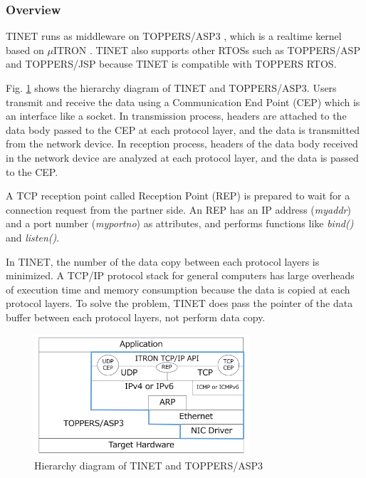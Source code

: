 \documentclass[conference]{IEEEtran/IEEEtran}
\begin{document}
\subsubsection{Overview}

TINET runs as middleware on TOPPERS/ASP3 \cite{par:ASP3} \cite{url:ASP3}, which is a realtime kernel based on $\mu$ITRON \cite{par:microITRON}.
TINET also supports other RTOSs such as TOPPERS/ASP and TOPPERS/JSP because TINET is compatible with TOPPERS RTOS.

Fig. \ref{fig:TINETHierarchyDiagram} shows the hierarchy diagram of TINET and TOPPERS/ASP3.
Users transmit and receive the data using a Communication End Point (CEP) which is an interface like a socket.
In transmission process, headers are attached to the data body passed to the CEP at each protocol layer, and the data is transmitted from the network device.
In reception process, headers of the data body received in the network device are analyzed at each protocol layer, and the data is passed to the CEP.

A TCP reception point called Reception Point (REP) is prepared to wait for a connection request from the partner side.
An REP has an IP address ({\it myaddr}) and a port number ({\it myportno}) as attributes, and performs functions like {\it bind()} and {\it listen()}.

In TINET, the number of the data copy between each protocol layers is minimized.
A TCP/IP protocol stack for general computers has large overheads of execution time and memory consumption because the data is copied at each protocol layers.
To solve the problem, TINET does pass the pointer of the data buffer between each protocol layers, not perform data copy.

\begin{figure}[t]
    \centering
    \includegraphics[width=8.0cm,clip]{figure/TINETHierarchyDiagram.pdf}
    \caption{Hierarchy diagram of TINET and TOPPERS/ASP3}
    \label{fig:TINETHierarchyDiagram}
\end{figure}
\end{document}
